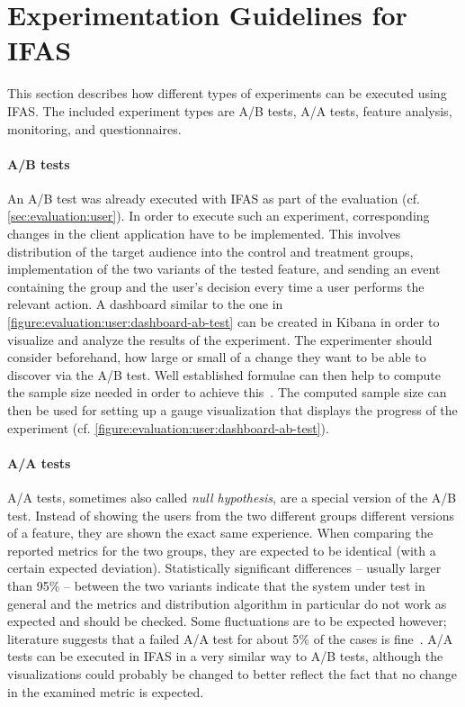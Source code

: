 \section{Experimentation Guidelines for IFAS}

This section describes how different types of experiments can be executed using \ac{IFAS}.
The included experiment types are A/B tests, A/A tests, feature analysis, monitoring, and questionnaires.

\paragraph{A/B tests}
An A/B test was already executed with \ac{IFAS} as part of the evaluation (cf. \cref{sec:evaluation:user}).
In order to execute such an experiment, corresponding changes in the client application have to be implemented.
This involves distribution of the target audience into the control and treatment groups, implementation of the two variants of the tested feature, and sending an event containing the group and the user's decision every time a user performs the relevant action.
A dashboard similar to the one in \cref{figure:evaluation:user:dashboard-ab-test} can be created in Kibana in order to visualize and analyze the results of the experiment.
The experimenter should consider beforehand, how large or small of a change they want to be able to discover via the A/B test.
Well established formulae can then help to compute the sample size needed in order to achieve this~\cite{Kohavi2009,box2005statistics}.
The computed sample size can then be used for setting up a gauge visualization that displays the progress of the experiment (cf. \cref{figure:evaluation:user:dashboard-ab-test}).

\paragraph{A/A tests}
A/A tests, sometimes also called \emph{null hypothesis}, are a special version of the A/B test.
Instead of showing the users from the two different groups different versions of a feature, they are shown the exact same experience.
When comparing the reported metrics for the two groups, they are expected to be identical (with a certain expected deviation).
Statistically significant differences -- usually larger than 95\% -- between the two variants indicate that the system under test in general and the metrics and distribution algorithm in particular do not work as expected and should be checked.
Some fluctuations are to be expected however; literature suggests that a failed A/A test for about 5\% of the cases is fine~\cite{Kohavi2009}.
A/A tests can be executed in \ac{IFAS} in a very similar way to A/B tests, although the visualizations could probably be changed to better reflect the fact that no change in the examined metric is expected.

